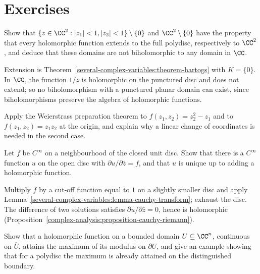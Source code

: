\section{Exercises}\label{several-complex-variables:section-exercises}

\begin{exercise}\label{several-complex-variables:exercise-hartogs-domain}
Show that $\{z \in \CC^2 : |z_1| < 1, |z_2| < 1\} \setminus \{0\}$ and $\CC^2 \setminus \{0\}$ have the property that every holomorphic function extends to the full polydisc, respectively to $\CC^2$, and
deduce that these domains are not biholomorphic to any domain in $\CC$.
\end{exercise}

\begin{solution}
Extension is Theorem~\ref{several-complex-variables:theorem-hartogs} with $K = \{0\}$. In $\CC$, the function $1/z$ is holomorphic on the punctured disc and does not extend; so no biholomorphism with a
punctured planar domain can exist, since biholomorphisms preserve the algebra of holomorphic functions.
\end{solution}

\begin{exercise}\label{several-complex-variables:exercise-weierstrass-example}
Apply the Weierstrass preparation theorem to $f(z_1, z_2) = z_2^2 - z_1$ and to $f(z_1, z_2) = z_1z_2$ at the origin, and explain why a linear change of coordinates is needed in the second case.
\end{exercise}

\begin{exercise}\label{several-complex-variables:exercise-dbar-one-variable}
Let $f$ be $C^\infty$ on a neighbourhood of the closed unit disc. Show that there is a $C^\infty$ function $u$ on the open disc with $\partial u/\partial\bar z = f$, and that $u$ is unique up to adding a
holomorphic function.
\end{exercise}

\begin{solution}
Multiply $f$ by a cut-off function equal to $1$ on a slightly smaller disc and apply Lemma~\ref{several-complex-variables:lemma-cauchy-transform}; exhaust the disc. The difference of two solutions satisfies
$\partial u/\partial\bar z = 0$, hence is holomorphic (Proposition~\ref{complex-analysis:proposition-cauchy-riemann}).
\end{solution}

\begin{exercise}\label{several-complex-variables:exercise-maximum-principle-boundary}
Show that a holomorphic function on a bounded domain $U \subseteq \CC^n$, continuous on $\overline{U}$, attains the maximum of its modulus on $\partial U$, and give an example showing that for a polydisc
the maximum is already attained on the distinguished boundary.
\end{exercise}
